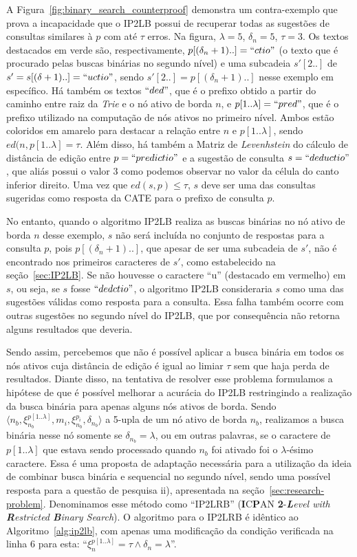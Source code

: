A Figura~\ref{fig:binary_search_counterproof} demonstra um contra-exemplo que prova a incapacidade que o IP2LB possui de recuperar todas as sugestões de consultas similares à $p$ com até $\tau$ erros. Na figura, $\lambda = 5$, $\delta_{n}=5$, $\tau=3$. Os textos destacados em verde são, respectivamente, $p[(\delta_{n}+1)..]=``ctio"$ (o texto que é procurado pelas buscas binárias no segundo nível) e uma subcadeia $s'[2..]$ de  $s'=s[(\delta+1)..]=``uctio"$, sendo $s'[2..] = p[(\delta_{n}+1)..]$ nesse exemplo em específico. Há também os textos $``ded"$, que é o prefixo obtido a partir do caminho entre raiz da \textit{Trie} e o nó ativo de borda $n$, e $p[1..\lambda] = ``pred"$, que é o prefixo utilizado na computação de nós ativos no primeiro nível. Ambos estão coloridos em amarelo para destacar a relação entre $n$ e $p[1..\lambda]$, sendo $ed(n, p[1..\lambda] = \tau$. Além disso, há também a Matriz de \textit{Levenhstein} do cálculo de distância de edição entre $p=``predictio"$ e a sugestão de consulta $s=``deductio"$, que aliás possui o valor $3$ como podemos observar no valor da célula do canto inferior direito. Uma vez que $ed(s, p) \leq \tau$, $s$ deve ser uma das consultas sugeridas como resposta da CATE para o prefixo de consulta $p$.

No entanto, quando o algoritmo IP2LB realiza as buscas binárias no nó ativo de borda $n$ desse exemplo, $s$ não será incluída no conjunto de respostas para a consulta $p$, pois $p[(\delta_{n}+1)..]$, que apesar de ser uma subcadeia de $s'$, não é encontrado nos primeiros caracteres de $s'$, como estabelecido na seção~\ref{sec:IP2LB}. Se não houvesse o caractere ``u'' (destacado em vermelho) em $s$, ou seja, se $s$ fosse $``dedctio"$, o algoritmo IP2LB consideraria $s$ como uma das sugestões válidas como resposta para a consulta. Essa falha também ocorre com outras sugestões no segundo nível do IP2LB, que por consequência não retorna alguns resultados que deveria.

Sendo assim, percebemos que não é possível aplicar a busca binária em todos os nós ativos cuja distância de edição é igual ao limiar $\tau$ sem que haja perda de resultados. Diante disso, na tentativa de resolver esse problema formulamos a hipótese de que é possível melhorar a acurácia do IP2LB restringindo a realização da busca binária para apenas alguns nós ativos de borda. Sendo $\langle n_{b}, \xi_{n_{b}}^{p[1..\lambda]}, m_{i}, \xi_{n_{b}}^{p_{i}}, \delta_{n_{b}} \rangle$ a 5-upla de um nó ativo de borda $n_b$, realizamos a busca binária nesse nó somente se $\delta_{n_{b}} = \lambda$, ou em outras palavras, se o caractere de $p[1..\lambda]$ que estava sendo processado quando $n_{b}$ foi ativado foi o $\lambda$-ésimo caractere. Essa é uma proposta de adaptação necessária para a utilização da ideia de combinar busca binária e sequencial no segundo nível, sendo uma possível resposta para a questão de pesquisa ii), apresentada na seção~\ref{sec:research-problem}. Denominamos esse método como ``IP2LRB'' (\textbf{I}C\textbf{P}AN \textbf{2}-\textit{\textbf{L}evel with \textbf{R}estricted \textbf{B}inary Search}). O algoritmo para o IP2LRB é idêntico ao Algoritmo~\ref{alg:ip2lb}, com apenas uma modificação da condição verificada na linha 6 para esta: ``$\xi_{n}^{p[1..\lambda]} = \tau \land \delta_{n} = \lambda$''.

